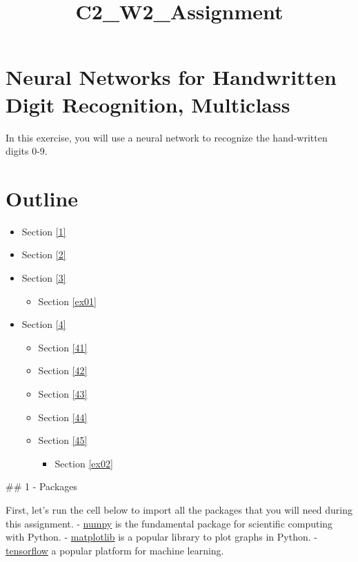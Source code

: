 \documentclass[11pt]{article}
\title{C2\_W2\_Assignment}
\providecommand{\tightlist}{%
      \setlength{\itemsep}{0pt}\setlength{\parskip}{0pt}}
\begin{document}
    
    \maketitle
    
    

    
    \hypertarget{neural-networks-for-handwritten-digit-recognition-multiclass}{%
\section{Neural Networks for Handwritten Digit Recognition,
Multiclass}\label{neural-networks-for-handwritten-digit-recognition-multiclass}}

In this exercise, you will use a neural network to recognize the
hand-written digits 0-9.

\hypertarget{outline}{%
\section{Outline}\label{outline}}

\begin{itemize}
\tightlist
\item
  Section \ref{1}
\item
  Section \ref{2}
\item
  Section \ref{3}

  \begin{itemize}
  \tightlist
  \item
    Section \ref{ex01}
  \end{itemize}
\item
  Section \ref{4}

  \begin{itemize}
  \tightlist
  \item
    Section \ref{41}
  \item
    Section \ref{42}
  \item
    Section \ref{43}
  \item
    Section \ref{44}
  \item
    Section \ref{45}

    \begin{itemize}
    \tightlist
    \item
      Section \ref{ex02}
    \end{itemize}
  \end{itemize}
\end{itemize}

    \#\# 1 - Packages

First, let's run the cell below to import all the packages that you will
need during this assignment. - \href{https://numpy.org/}{numpy} is the
fundamental package for scientific computing with Python. -
\href{http://matplotlib.org}{matplotlib} is a popular library to plot
graphs in Python. - \href{https://www.tensorflow.org/}{tensorflow} a
popular platform for machine learning.
\end{document}
